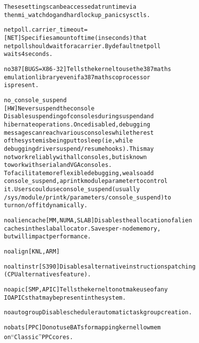 \documentclass[a4paper,8pt,english]{sphinxmanual}
\begin{document}
\begin{alltt}
                        These settings can be accessed at runtime via
                        the nmi\_watchdog and hardlockup\_panic sysctls.

        netpoll.carrier\_timeout=
                        {[}NET{]} Specifies amount of time (in seconds) that
                        netpoll should wait for a carrier. By default netpoll
                        waits 4 seconds.

        no387           {[}BUGS=X86-32{]} Tells the kernel to use the 387 maths
                        emulation library even if a 387 maths coprocessor
                        is present.

        no\_console\_suspend
                        {[}HW{]} Never suspend the console
                        Disable suspending of consoles during suspend and
                        hibernate operations.  Once disabled, debugging
                        messages can reach various consoles while the rest
                        of the system is being put to sleep (ie, while
                        debugging driver suspend/resume hooks).  This may
                        not work reliably with all consoles, but is known
                        to work with serial and VGA consoles.
                        To facilitate more flexible debugging, we also add
                        console\_suspend, a printk module parameter to control
                        it. Users could use console\_suspend (usually
                        /sys/module/printk/parameters/console\_suspend) to
                        turn on/off it dynamically.

        noaliencache    {[}MM, NUMA, SLAB{]} Disables the allocation of alien
                        caches in the slab allocator.  Saves per-node memory,
                        but will impact performance.

        noalign         {[}KNL,ARM{]}

        noaltinstr      {[}S390{]} Disables alternative instructions patching
                        (CPU alternatives feature).

        noapic          {[}SMP,APIC{]} Tells the kernel to not make use of any
                        IOAPICs that may be present in the system.

        noautogroup     Disable scheduler automatic task group creation.

        nobats          {[}PPC{]} Do not use BATs for mapping kernel lowmem
                        on ``Classic'' PPC cores.


\end{alltt}
\end{document}

